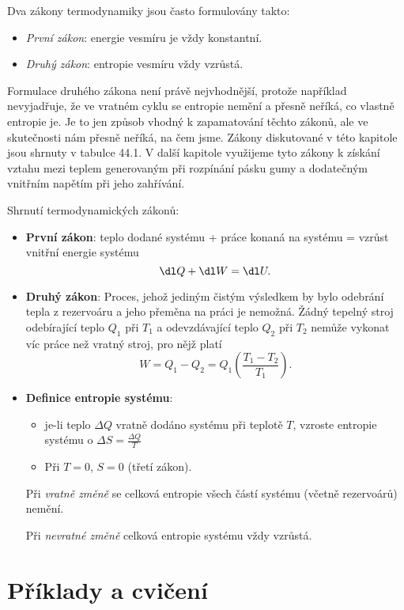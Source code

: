     Dva zákony termodynamiky jsou často formulovány takto:
    \begin{itemize}[noitemsep]
      \item \emph{První zákon}: energie vesmíru je vždy konstantní.
      \item \emph{Druhý zákon}: entropie vesmíru vždy vzrůstá.
    \end{itemize}

    Formulace druhého zákona není právě nejvhodnější, protože například nevyjadřuje, že ve vratném
    cyklu se entropie nemění a přesně neříká, co vlastně entropie je. Je to jen způsob vhodný k
    zapamatování těchto zákonů, ale ve skutečnosti nám přesně neříká, na čem jsme. Zákony
    diskutované v této kapitole jsou shrnuty v tabulce 44.1. V další kapitole využijeme tyto zákony
    k získání vztahu mezi teplem generovaným při rozpínání pásku gumy a dodatečným vnitřním napětím
    při jeho zahřívání.

    \begin{tcnote}Shrnutí termodynamických zákonů:
      \begin{itemize}[noitemsep]
        \item \textbf{První zákon}: teplo dodané systému + práce konaná na systému = vzrůst vnitřní
              energie systému 
              \begin{equation*}
                \dl Q + \dl W=\dl U.
              \end{equation*}
        \item \textbf{Druhý zákon}: Proces, jehož jediným čistým výsledkem by bylo odebrání tepla z
              rezervoáru a jeho přeměna na práci je nemožná. Žádný tepelný stroj odebírající teplo
              \(Q_1\) při \(T_1\) a odevzdávající teplo \(Q_2\) při \(T_2\) nemůže vykonat víc práce
              než vratný stroj, pro nějž platí
              \begin{equation*}
                W=Q_1−Q_2=Q_1\left(\frac{T_1−T_2}{T_1}\right).
              \end{equation*}
        \item \textbf{Definice entropie systému}:
              \begin{itemize}
                \item je-li teplo \( ΔQ\) vratně dodáno systému při teplotě \(T\), vzroste entropie
                      systému o \(ΔS=\frac{ΔQ}{T}\)
                \item Při \(T=0\), \(S=0\) (třetí zákon).
              \end{itemize}  
              Při \emph{vratně změně} se celková entropie všech částí systému (včetně rezervoárů)
              nemění.
              
              Při \emph{nevratné změně} celková entropie systému vždy vzrůstá.  
      \end{itemize}
    \end{tcnote}
  
  \section{Příklady a cvičení}\label{fyz:IchapXLIVsecVII}
